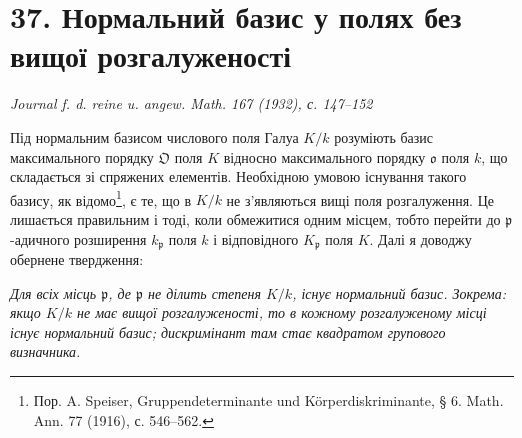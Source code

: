 \documentclass[11pt]{article}
\providecommand{\frakO}{\mathfrak{O}}
\providecommand{\frako}{\mathfrak{o}}
\providecommand{\frakp}{\mathfrak{p}}
\begin{document}
\section*{37. Нормальний базис у полях без вищої розгалуженості}

\begin{center}
\emph{Journal f. d. reine u. angew. Math. 167 (1932), с. 147--152}
\end{center}

Під нормальним базисом числового поля Галуа \(K/k\) розуміють базис максимального порядку \(\frakO\) поля \(K\) відносно максимального порядку \(\frako\) поля \(k\), що складається зі спряжених елементів. Необхідною умовою існування такого базису, як відомо\footnote{Пор. A. Speiser, Gruppendeterminante und Körperdiskriminante, § 6. Math. Ann. 77 (1916), с. 546--562.}, є те, що в \(K/k\) не з'являються вищі поля розгалуження. Це лишається правильним і тоді, коли обмежитися одним місцем, тобто перейти до \(\frakp\)-адичного розширення \(k_\frakp\) поля \(k\) і відповідного \(K_\frakp\) поля \(K\). Далі я доводжу обернене твердження:

\emph{Для всіх місць \(\frakp\), де \(\frakp\) не ділить степеня \(K/k\), існує нормальний базис. Зокрема: якщо \(K/k\) не має вищої розгалуженості, то в кожному розгалуженому місці існує нормальний базис; дискримінант там стає квадратом групового визначника.}
\end{document}
